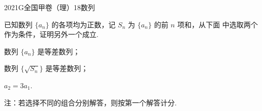 
\begin{problem}{2021}{G}{全国甲卷（理）}{18}{数列}

已知数列 $\{a_n\}$ 的各项均为正数，记 $S_n$ 为 $\{a_n\}$ 的前 $n$ 项和，从下面  中选取两个作为条件，证明另外一个成立.

 数列 $\{a_n\}$ 是等差数列；

 数列 $\{\sqrt{S_n}\}$ 是等差数列；

 $a_2=3a_1$.

注：若选择不同的组合分别解答，则按第一个解答计分.

\end{problem}